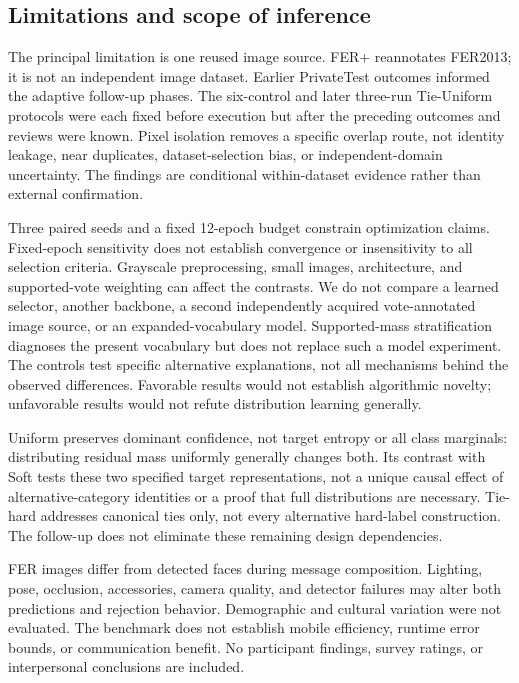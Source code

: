 \documentclass[pdflatex,sn-mathphys-num]{sn-jnl}
\begin{document}
\subsection{Limitations and scope of inference}
The principal limitation is one reused image source. FER+ reannotates FER2013; it is not an independent image dataset. Earlier PrivateTest outcomes informed the adaptive follow-up phases. The six-control and later three-run Tie-Uniform protocols were each fixed before execution but after the preceding outcomes and reviews were known. Pixel isolation removes a specific overlap route, not identity leakage, near duplicates, dataset-selection bias, or independent-domain uncertainty. The findings are conditional within-dataset evidence rather than external confirmation.

Three paired seeds and a fixed 12-epoch budget constrain optimization claims. Fixed-epoch sensitivity does not establish convergence or insensitivity to all selection criteria. Grayscale preprocessing, small images, architecture, and supported-vote weighting can affect the contrasts. We do not compare a learned selector, another backbone, a second independently acquired vote-annotated image source, or an expanded-vocabulary model. Supported-mass stratification diagnoses the present vocabulary but does not replace such a model experiment. The controls test specific alternative explanations, not all mechanisms behind the observed differences. Favorable results would not establish algorithmic novelty; unfavorable results would not refute distribution learning generally.

Uniform preserves dominant confidence, not target entropy or all class marginals: distributing residual mass uniformly generally changes both. Its contrast with Soft tests these two specified target representations, not a unique causal effect of alternative-category identities or a proof that full distributions are necessary. Tie-hard addresses canonical ties only, not every alternative hard-label construction. The follow-up does not eliminate these remaining design dependencies.

FER images differ from detected faces during message composition. Lighting, pose, occlusion, accessories, camera quality, and detector failures may alter both predictions and rejection behavior. Demographic and cultural variation were not evaluated. The benchmark does not establish mobile efficiency, runtime error bounds, or communication benefit. No participant findings, survey ratings, or interpersonal conclusions are included.
\end{document}
